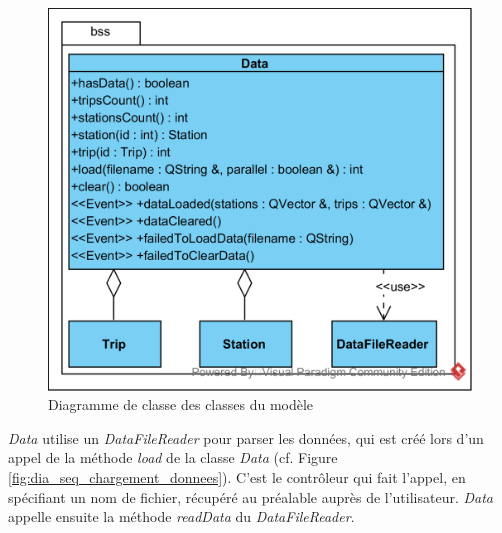 \documentclass[12pt]{article}
\begin{document}
		\begin{figure}[!h]
		\begin{center}
		\includegraphics[scale=1]{dia_class_modele.png}
		\caption{Diagramme de classe des classes du modèle}
		\label{fig:dia_classe_modele}
		\end{center}
		\end{figure}
		
		\textit{Data} utilise un \textit{DataFileReader} pour parser les données, qui est créé lors d’un appel de la méthode \textit{load} de la classe \textit{Data} (cf. Figure \ref{fig:dia_seq_chargement_donnees}). C’est le contrôleur qui fait l’appel, en spécifiant un nom de fichier, récupéré au préalable auprès de l’utilisateur. \textit{Data} appelle ensuite la méthode \textit{readData} du \textit{DataFileReader}.\\
	
\end{document}

